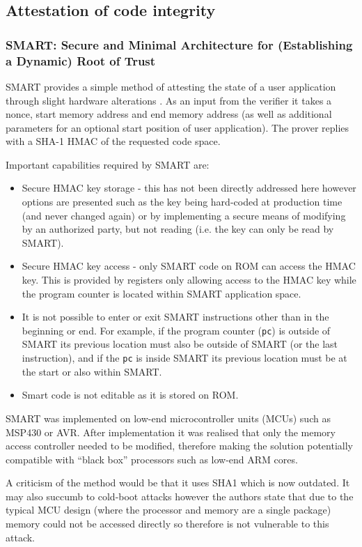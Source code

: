 \subsection{Attestation of code integrity} \label{staticAttestationSolutions}

\subsubsection*{SMART: Secure and Minimal Architecture for (Establishing a Dynamic) Root of Trust}
SMART provides a simple method of attesting the state of a user application through slight hardware alterations \cite{For}. As an input from the verifier it takes a nonce, start memory address and end memory address (as well as additional parameters for an optional start position of user application). The prover replies with a SHA-1 HMAC of the requested code space.

Important capabilities required by SMART are:
\begin{itemize}
	\item Secure HMAC key storage - this has not been directly addressed here however options are presented such as the key being hard-coded at production time (and never changed again) or by implementing a secure means of modifying by an authorized party, but not reading (i.e. the key can only be read by SMART).
	\item Secure HMAC key access - only SMART code on ROM can access the HMAC key. This is provided by registers only allowing access to the HMAC key while the program counter is located within SMART application space.
	\item It is not possible to enter or exit SMART instructions other than in the beginning or end. For example, if the program counter (\verb|pc|) is outside of SMART its previous location must also be outside of SMART (or the last instruction), and if the \verb|pc| is inside SMART its previous location must be at the start or also within SMART.
	\item Smart code is not editable as it is stored on ROM.
\end{itemize}

SMART was implemented on low-end microcontroller units (MCUs) such as MSP430 or AVR. After implementation it was realised that only the memory access controller needed to be modified, therefore making the solution potentially compatible with ``black box'' processors such as low-end ARM cores.

A criticism of the method would be that it uses SHA1 which is now outdated. It may also succumb to cold-boot attacks however the authors state that due to the typical MCU design (where the processor and memory are a single package) memory could not be accessed directly so therefore is not vulnerable to this attack.

